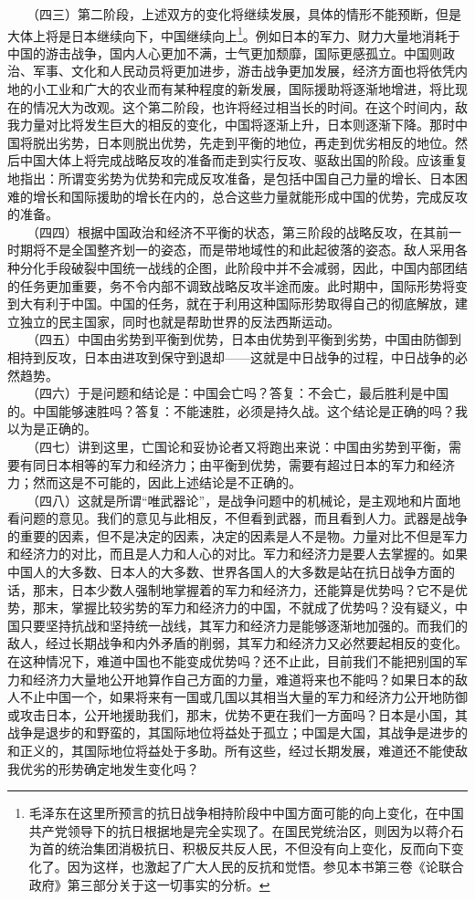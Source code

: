 \documentclass[cn,11pt,chinese]{elegantbook}
\begin{document}
　　（四三）第二阶段，上述双方的变化将继续发展，具体的情形不能预断，但是大体上将是日本继续向下，中国继续向上\footnote[18]{ 毛泽东在这里所预言的抗日战争相持阶段中中国方面可能的向上变化，在中国共产党领导下的抗日根据地是完全实现了。在国民党统治区，则因为以蒋介石为首的统治集团消极抗日、积极反共反人民，不但没有向上变化，反而向下变化了。因为这样，也激起了广大人民的反抗和觉悟。参见本书第三卷《论联合政府》第三部分关于这一切事实的分析。}。例如日本的军力、财力大量地消耗于中国的游击战争，国内人心更加不满，士气更加颓靡，国际更感孤立。中国则政治、军事、文化和人民动员将更加进步，游击战争更加发展，经济方面也将依凭内地的小工业和广大的农业而有某种程度的新发展，国际援助将逐渐地增进，将比现在的情况大为改观。这个第二阶段，也许将经过相当长的时间。在这个时间内，敌我力量对比将发生巨大的相反的变化，中国将逐渐上升，日本则逐渐下降。那时中国将脱出劣势，日本则脱出优势，先走到平衡的地位，再走到优劣相反的地位。然后中国大体上将完成战略反攻的准备而走到实行反攻、驱敌出国的阶段。应该重复地指出：所谓变劣势为优势和完成反攻准备，是包括中国自己力量的增长、日本困难的增长和国际援助的增长在内的，总合这些力量就能形成中国的优势，完成反攻的准备。\\
　　（四四）根据中国政治和经济不平衡的状态，第三阶段的战略反攻，在其前一时期将不是全国整齐划一的姿态，而是带地域性的和此起彼落的姿态。敌人采用各种分化手段破裂中国统一战线的企图，此阶段中并不会减弱，因此，中国内部团结的任务更加重要，务不令内部不调致战略反攻半途而废。此时期中，国际形势将变到大有利于中国。中国的任务，就在于利用这种国际形势取得自己的彻底解放，建立独立的民主国家，同时也就是帮助世界的反法西斯运动。\\
　　（四五）中国由劣势到平衡到优势，日本由优势到平衡到劣势，中国由防御到相持到反攻，日本由进攻到保守到退却——这就是中日战争的过程，中日战争的必然趋势。\\
　　（四六）于是问题和结论是：中国会亡吗？答复：不会亡，最后胜利是中国的。中国能够速胜吗？答复：不能速胜，必须是持久战。这个结论是正确的吗？我以为是正确的。\\
　　（四七）讲到这里，亡国论和妥协论者又将跑出来说：中国由劣势到平衡，需要有同日本相等的军力和经济力；由平衡到优势，需要有超过日本的军力和经济力；然而这是不可能的，因此上述结论是不正确的。\\
　　（四八）这就是所谓“唯武器论”，是战争问题中的机械论，是主观地和片面地看问题的意见。我们的意见与此相反，不但看到武器，而且看到人力。武器是战争的重要的因素，但不是决定的因素，决定的因素是人不是物。力量对比不但是军力和经济力的对比，而且是人力和人心的对比。军力和经济力是要人去掌握的。如果中国人的大多数、日本人的大多数、世界各国人的大多数是站在抗日战争方面的话，那末，日本少数人强制地掌握着的军力和经济力，还能算是优势吗？它不是优势，那末，掌握比较劣势的军力和经济力的中国，不就成了优势吗？没有疑义，中国只要坚持抗战和坚持统一战线，其军力和经济力是能够逐渐地加强的。而我们的敌人，经过长期战争和内外矛盾的削弱，其军力和经济力又必然要起相反的变化。在这种情况下，难道中国也不能变成优势吗？还不止此，目前我们不能把别国的军力和经济力大量地公开地算作自己方面的力量，难道将来也不能吗？如果日本的敌人不止中国一个，如果将来有一国或几国以其相当大量的军力和经济力公开地防御或攻击日本，公开地援助我们，那末，优势不更在我们一方面吗？日本是小国，其战争是退步的和野蛮的，其国际地位将益处于孤立；中国是大国，其战争是进步的和正义的，其国际地位将益处于多助。所有这些，经过长期发展，难道还不能使敌我优劣的形势确定地发生变化吗？\\
\end{document}
